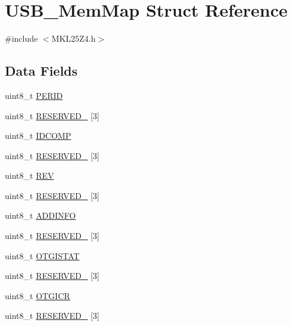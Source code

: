 \hypertarget{struct_u_s_b___mem_map}{}\section{U\+S\+B\+\_\+\+Mem\+Map Struct Reference}
\label{struct_u_s_b___mem_map}


{\ttfamily \#include $<$M\+K\+L25\+Z4.\+h$>$}

\subsection*{Data Fields}
\begin{DoxyCompactItemize}
\item 
uint8\+\_\+t \hyperlink{struct_u_s_b___mem_map_af90a61467080255b062e7a3ed7179e3a}{P\+E\+R\+ID}
\item 
uint8\+\_\+t \hyperlink{struct_u_s_b___mem_map_a6d02c9345b2d39c945c905d46077a0ec}{R\+E\+S\+E\+R\+V\+E\+D\+\_} \mbox{[}3\mbox{]}
\item 
uint8\+\_\+t \hyperlink{struct_u_s_b___mem_map_a694d344ab54e43fa5ce23e1aeae4069a}{I\+D\+C\+O\+MP}
\item 
uint8\+\_\+t \hyperlink{struct_u_s_b___mem_map_a8920d7bfe319ce3f5af958ad4c8f2cca}{R\+E\+S\+E\+R\+V\+E\+D\+\_} \mbox{[}3\mbox{]}
\item 
uint8\+\_\+t \hyperlink{struct_u_s_b___mem_map_a95133aaa5ed5ba8a03154f5fe270b84a}{R\+EV}
\item 
uint8\+\_\+t \hyperlink{struct_u_s_b___mem_map_a76a9ec2331c09e8e213dfb169fbac870}{R\+E\+S\+E\+R\+V\+E\+D\+\_} \mbox{[}3\mbox{]}
\item 
uint8\+\_\+t \hyperlink{struct_u_s_b___mem_map_aa53fb603c9949324b88be8514f856671}{A\+D\+D\+I\+N\+FO}
\item 
uint8\+\_\+t \hyperlink{struct_u_s_b___mem_map_a2a68f89086ca788e9123a2281decfe22}{R\+E\+S\+E\+R\+V\+E\+D\+\_} \mbox{[}3\mbox{]}
\item 
uint8\+\_\+t \hyperlink{struct_u_s_b___mem_map_a418c1814b43ee98065383e8270708b5e}{O\+T\+G\+I\+S\+T\+AT}
\item 
uint8\+\_\+t \hyperlink{struct_u_s_b___mem_map_a22ca61cf43a11168ba32640820999621}{R\+E\+S\+E\+R\+V\+E\+D\+\_} \mbox{[}3\mbox{]}
\item 
uint8\+\_\+t \hyperlink{struct_u_s_b___mem_map_a377a3bd77416462f581c6f00f7abc263}{O\+T\+G\+I\+CR}
\item 
uint8\+\_\+t \hyperlink{struct_u_s_b___mem_map_a9e87bdf948b19c8681f1f83ee5a8c000}{R\+E\+S\+E\+R\+V\+E\+D\+\_} \mbox{[}3\mbox{]}

\end{DoxyCompactItemize}

